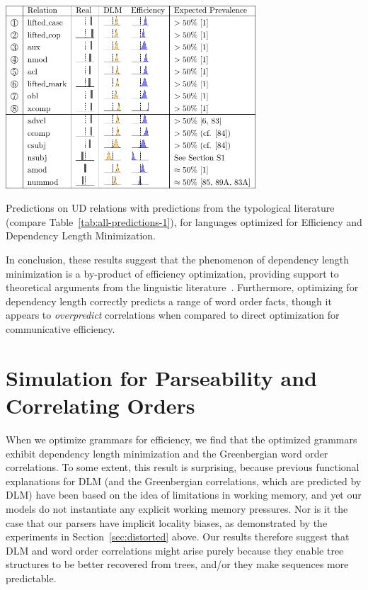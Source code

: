 \documentclass[10pt,twoside,lineno]{article}
\begin{document}
\begin{table}[ht] 
	\begin{center}	
\includegraphics[width=0.7\textwidth]{si-table-perrel-1b-1.png}
\end{center}
\caption{Predictions on UD relations with predictions from the typological literature (compare Table~\ref{tab:all-predictions-1}), for languages optimized for Efficiency and Dependency Length Minimization.
}
\label{tab:all-predictions-1b}
\end{table}




In conclusion, these results suggest that the phenomenon of dependency length minimization is a by-product of efficiency optimization, providing support to theoretical arguments from the linguistic literature~\cite{hawkins1994performance,futrell2017memory, futrell2017generalizing}.
Furthermore, optimizing for dependency length correctly predicts a range of word order facts, though it appears to \emph{overpredict} correlations when compared to direct optimization for communicative efficiency.






\section{Simulation for Parseability and Correlating Orders}

%

When we optimize grammars for efficiency, we find that the optimized grammars exhibit dependency length minimization and the Greenbergian word order correlations. To some extent, this result is surprising, because previous functional explanations for DLM (and the Greenbergian correlations, which are predicted by DLM) have been based on the idea of limitations in working memory, and yet our models do not instantiate any explicit working memory pressures. Nor is it the case that our parsers have implicit locality biases, as demonstrated by the experiments in Section~\ref{sec:distorted} above. Our results therefore suggest that DLM and word order correlations might arise purely because they enable tree structures to be better recovered from trees, and/or they make sequences more predictable. 
\end{document}

